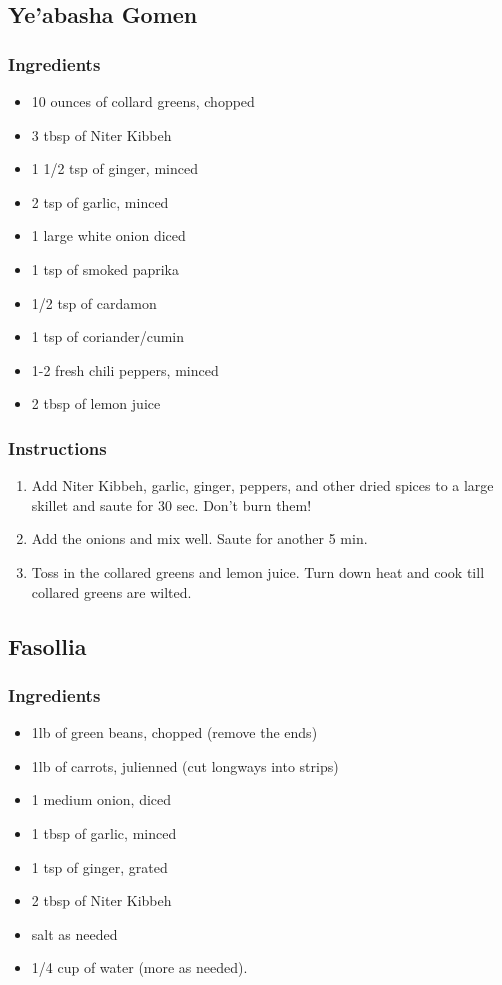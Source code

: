 \documentclass[11pt]{article}
\begin{document}
\subsection{Ye'abasha Gomen}
\label{sec:orgb106826}
\subsubsection*{Ingredients}
\label{sec:org623c8eb}
\begin{itemize}
\item 10 ounces of collard greens, chopped
\item 3 tbsp of Niter Kibbeh
\item 1 1/2 tsp of ginger, minced
\item 2 tsp of garlic, minced
\item 1 large white onion diced
\item 1 tsp of smoked paprika
\item 1/2 tsp of cardamon
\item 1 tsp of coriander/cumin
\item 1-2 fresh chili peppers, minced
\item 2 tbsp of lemon juice
\end{itemize}
\subsubsection*{Instructions}
\label{sec:org9e374a3}
\begin{enumerate}
\item Add Niter Kibbeh, garlic, ginger, peppers, and other dried spices to a large skillet and saute for 30 sec. Don't burn them!
\item Add the onions and mix well. Saute for another 5 min.
\item Toss in the collared greens and lemon juice. Turn down heat and cook till collared greens are wilted.
\end{enumerate}
\subsection{Fasollia}
\label{sec:orgda779da}
\subsubsection*{Ingredients}
\label{sec:orgdb8b584}
\begin{itemize}
\item 1lb of green beans, chopped (remove the ends)
\item 1lb of carrots, julienned (cut longways into strips)
\item 1 medium onion, diced
\item 1 tbsp of garlic, minced
\item 1 tsp of ginger, grated
\item 2 tbsp of Niter Kibbeh
\item salt as needed
\item 1/4 cup of water (more as needed).
\end{itemize}
\end{document}

